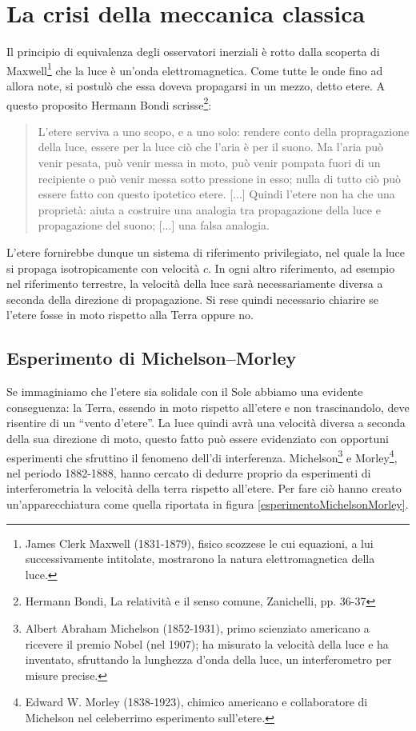 \chapter{La crisi della meccanica classica}

Il principio di equivalenza degli osservatori inerziali è rotto dalla scoperta di
Maxwell\footnote{James Clerk Maxwell (1831-1879), fisico scozzese le cui equazioni, a lui successivamente intitolate, mostrarono
la natura elettromagnetica della luce.} che la luce è un'onda elettromagnetica. Come tutte le onde fino ad allora note, 
si postulò che essa doveva propagarsi in un mezzo, detto etere.
A questo proposito Hermann Bondi scrisse\footnote{Hermann Bondi, La relatività e il senso comune, Zanichelli, pp. 36-37}:
\begin{quotation}
L'etere serviva a uno scopo, e a uno solo: rendere conto della propragazione della luce, 
essere per la luce ciò che l'aria è per il suono.
Ma l'aria può venir pesata, può venir messa in moto, può venir pompata fuori di un recipiente 
o può venir messa sotto pressione in esso; nulla di tutto ciò può essere fatto con questo 
ipotetico etere. [...]
Quindi l'etere non ha che una proprietà: aiuta a costruire una analogia tra propagazione della luce 
e propagazione del suono; [...] una falsa analogia. 
\end{quotation}

L'etere fornirebbe dunque un sistema di riferimento privilegiato, nel quale la luce si propaga 
isotropicamente con velocità $c$. In ogni altro riferimento, ad esempio nel riferimento terrestre,
la velocità della luce sarà necessariamente diversa a seconda della direzione di
propagazione. Si rese quindi necessario chiarire se l'etere fosse in moto rispetto alla Terra oppure no.

\section{Esperimento di Michelson--Morley}

Se immaginiamo che l'etere sia solidale con il Sole abbiamo una evidente conseguenza: la Terra, essendo in moto 
rispetto all'etere e non trascinandolo, deve risentire di un ``vento d'etere''.
La luce quindi avrà una velocità diversa a seconda della sua direzione di moto, questo fatto può essere evidenziato 
con opportuni esperimenti che sfruttino il fenomeno dell'di interferenza. 
Michelson\footnote{Albert Abraham Michelson (1852-1931), 
primo scienziato americano a ricevere il premio Nobel (nel 1907); 
ha misurato la velocità della luce e ha inventato, sfruttando la
lunghezza d'onda della luce, un interferometro per misure precise.} e 
Morley\footnote{Edward W. Morley (1838-1923), chimico americano e collaboratore di Michelson nel
celeberrimo esperimento sull'etere.}, nel periodo 1882-1888, hanno cercato
di dedurre proprio da esperimenti di interferometria la velocità della terra
rispetto all'etere. Per fare ciò hanno creato un'apparecchiatura come quella
riportata in figura \ref{esperimentoMichelsonMorley}.

